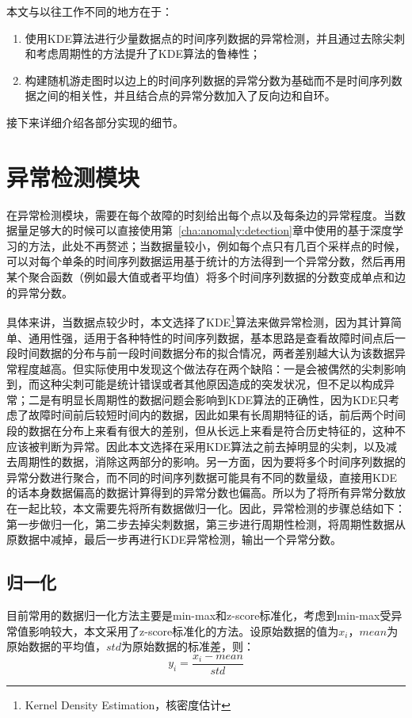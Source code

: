 本文与以往工作不同\cite{lin2016automated,weng2018root,wu2020microrca}的地方在于：

\begin{enumerate}
  \item 使用KDE算法进行少量数据点的时间序列数据的异常检测，并且通过去除尖刺和考虑周期性的方法提升了KDE算法的鲁棒性；
  \item 构建随机游走图时以边上的时间序列数据的异常分数为基础而不是时间序列数据之间的相关性，并且结合点的异常分数加入了反向边和自环。
\end{enumerate}

接下来详细介绍各部分实现的细节。
\section{异常检测模块}
\label{sec:anomaly:detection}
在异常检测模块，需要在每个故障的时刻给出每个点以及每条边的异常程度。当数据量足够大的时候可以直接使用第~\ref{cha:anomaly:detection}章中使用的基于深度学习的方法，此处不再赘述；当数据量较小，例如每个点只有几百个采样点的时候，可以对每个单条的时间序列数据运用基于统计的方法得到一个异常分数，然后再用某个聚合函数（例如最大值或者平均值）将多个时间序列数据的分数变成单点和边的异常分数。

具体来讲，当数据点较少时，本文选择了KDE\footnote{Kernel Density Estimation，核密度估计}算法来做异常检测，因为其计算简单、通用性强，适用于各种特性的时间序列数据，基本思路是查看故障时间点后一段时间数据的分布与前一段时间数据分布的拟合情况，两者差别越大认为该数据异常程度越高。但实际使用中发现这个做法存在两个缺陷：一是会被偶然的尖刺影响到，而这种尖刺可能是统计错误或者其他原因造成的突发状况，但不足以构成异常；二是有明显长周期性的数据问题会影响到KDE算法的正确性，因为KDE只考虑了故障时间前后较短时间内的数据，因此如果有长周期特征的话，前后两个时间段的数据在分布上来看有很大的差别，但从长远上来看是符合历史特征的，这种不应该被判断为异常。因此本文选择在采用KDE算法之前去掉明显的尖刺，以及减去周期性的数据，消除这两部分的影响。另一方面，因为要将多个时间序列数据的异常分数进行聚合，而不同的时间序列数据可能具有不同的数量级，直接用KDE的话本身数据偏高的数据计算得到的异常分数也偏高。所以为了将所有异常分数放在一起比较，本文需要先将所有数据做归一化。因此，异常检测的步骤总结如下：第一步做归一化，第二步去掉尖刺数据，第三步进行周期性检测，将周期性数据从原数据中减掉，最后一步再进行KDE异常检测，输出一个异常分数。
\subsection{归一化}
目前常用的数据归一化方法主要是min-max和z-score标准化，考虑到min-max受异常值影响较大，本文采用了z-score标准化的方法。设原始数据的值为$x_i$，$mean$为原始数据的平均值，$std$为原始数据的标准差，则：
\begin{equation*}
y_i = \frac{x_i-mean}{std}
\end{equation*}

